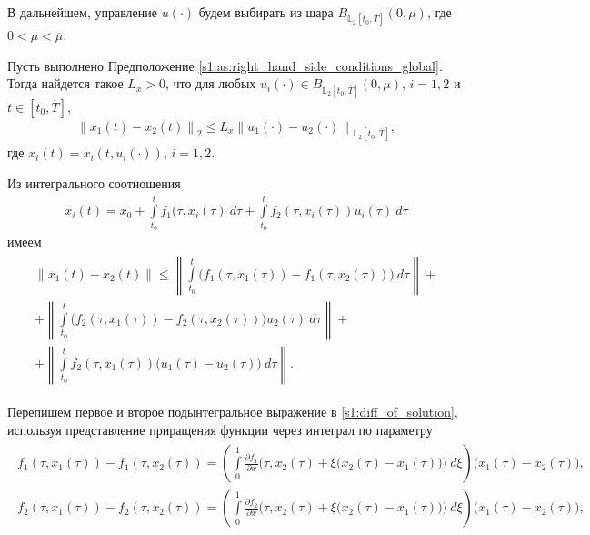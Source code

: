 \documentclass[../main.tex]{subfiles}
\begin{document}
В дальнейшем, управление $ u(\cdot) $ будем выбирать из шара $ B_{\mathbb{L}_2[t_0, \overline{T}]}(0,\mu) $, где $ 0 < \mu < \overline{\mu} $.
    
\begin{lemma}\label{s1:lem:lip_of_solutions_global}
    Пусть выполнено Предположение \ref{s1:as:right_hand_side_conditions_global}.
    Тогда найдется такое $L_x > 0$, что для любых $u_i(\cdot) \in B_{\mathbb{L}_2[t_0, \overline{T}]}(0,\mu) $, $i = 1,2$ и $t \in [t_0, \overline{T}]$, 
    \begin{gather*}
        \left\| x_1(t) - x_2(t) \right\|_2 \leqslant L_x \left\|u_1(\cdot) - u_2(\cdot) \right\|_{\mathbb{L}_2[t_0, \overline{T}]}, 
    \end{gather*}
    где $x_i(t) = x_i(t,u_i(\cdot))$, $i = 1,2$. 
\end{lemma}
\doc
Из интегрального соотношения
\begin{gather*}
     x_i(t) = x_0 + \int\limits_{t_0}^{t} f_1(\tau, x_i(\tau)\ d\tau + \int\limits_{t_0}^{t} f_2(\tau,x_i(\tau))u_i(\tau)\ d\tau 
\end{gather*}
имеем 
\begin{gather}\label{s1:diff_of_solution}
\begin{gathered}
    \| x_1(t) - x_2(t) \| \leqslant 
    \left\|  \int\limits_{t_0}^{t} \Big( f_1(\tau, x_1(\tau)) - f_1(\tau, x_2(\tau)) \Big) \ d\tau \right\| +  \\ + 
    \left\|  \int\limits_{t_0}^{t} \Big( f_2(\tau, x_1(\tau)) - f_2(\tau,x_2(\tau)) \Big) u_2(\tau) \ d\tau \right\| + \\ +
    \left\|  \int\limits_{t_0}^{t} f_2(\tau,x_1(\tau)) \big( u_1(\tau) - u_2(\tau) \big) \ d\tau \right\|. 
\end{gathered}
\end{gather}
    
Перепишем первое и второе подынтегральное выражение в \eqref{s1:diff_of_solution}, используя представление приращения функции через интеграл по параметру
\begin{gather}\label{s1:meanvalue}
\begin{gathered}
    f_1(\tau, x_1(\tau)) - f_1(\tau, x_2(\tau)) = \left(  \int\limits_0^1 \frac{\partial f_1}{\partial x} \Big(\tau, x_2(\tau) + \xi \big(x_2(\tau) - x_1(\tau)\big)\Big) \ d\xi \right) \big(x_1(\tau) - x_2(\tau)\big), \\ 
    f_2(\tau, x_1(\tau)) - f_2(\tau, x_2(\tau)) = \left(  \int\limits_0^1 \frac{\partial f_2}{\partial x} \Big(\tau, x_2(\tau) + \xi \big(x_2(\tau) - x_1(\tau)\big)\Big) \ d\xi \right) \big(x_1(\tau) - x_2(\tau)\big), 
\end{gathered}
\end{gather}
    
\end{document}

